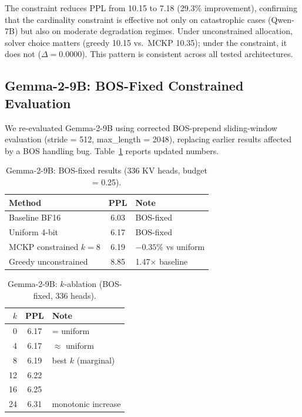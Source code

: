 \documentclass[11pt,a4paper]{article}
\begin{document}
The constraint reduces PPL from 10.15 to 7.18 (29.3\% improvement), confirming that the cardinality constraint is effective not only on catastrophic cases (Qwen-7B) but also on moderate degradation regimes.
Under unconstrained allocation, solver choice matters (greedy 10.15 vs.\ MCKP 10.35); under the constraint, it does not ($\Delta = 0.0000$).
This pattern is consistent across all tested architectures.

\subsection{Gemma-2-9B: BOS-Fixed Constrained Evaluation}
\label{sec:gemma2}

We re-evaluated Gemma-2-9B using corrected BOS-prepend sliding-window evaluation (stride = 512, max\_length = 2048), replacing earlier results affected by a BOS handling bug.
Table~\ref{tab:gemma2_bos} reports updated numbers.

\begin{table}[t]
\centering
\caption{Gemma-2-9B: BOS-fixed results (336 KV heads, budget = 0.25).}
\label{tab:gemma2_bos}
\begin{tabular}{lcl}
\toprule
Method & PPL & Note \\
\midrule
Baseline BF16            & 6.03 & BOS-fixed \\
Uniform 4-bit            & 6.17 & BOS-fixed \\
MCKP constrained $k{=}8$  & 6.19 & $-0.35\%$ vs uniform \\
Greedy unconstrained     & 8.85 & 1.47$\times$ baseline \\
\bottomrule
\end{tabular}
\end{table}

\begin{table}[t]
\centering
\caption{Gemma-2-9B: $k$-ablation (BOS-fixed, 336 heads).}
\label{tab:gemma2_k}
\begin{tabular}{rcl}
\toprule
$k$ & PPL & Note \\
\midrule
0  & 6.17 & = uniform \\
4  & 6.17 & $\approx$ uniform \\
8  & 6.19 & best $k$ (marginal) \\
12 & 6.22 & \\
16 & 6.25 & \\
24 & 6.31 & monotonic increase \\
\bottomrule
\end{tabular}
\end{table}
\end{document}
